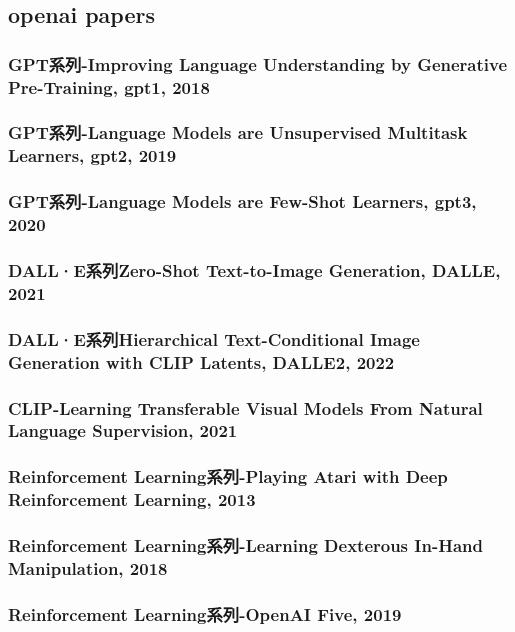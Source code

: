 \documentclass[twocolumn, 10pt]{article} %
\begin{document}
\subsection{openai papers}

\subsubsection{ GPT系列-Improving Language Understanding by Generative Pre-Training, gpt1, 2018}

\subsubsection{GPT系列-Language Models are Unsupervised Multitask Learners, gpt2, 2019}

\subsubsection{GPT系列-Language Models are Few-Shot Learners, gpt3, 2020}


\subsubsection{DALL·E系列Zero-Shot Text-to-Image Generation, DALLE, 2021}

\subsubsection{DALL·E系列Hierarchical Text-Conditional Image Generation with CLIP Latents, DALLE2, 2022}

\subsubsection{CLIP-Learning Transferable Visual Models From Natural Language Supervision, 2021}


\subsubsection{Reinforcement Learning系列-Playing Atari with Deep Reinforcement Learning, 2013}


\subsubsection{Reinforcement Learning系列-Learning Dexterous In-Hand Manipulation, 2018}


\subsubsection{Reinforcement Learning系列-OpenAI Five, 2019}
\end{document}
